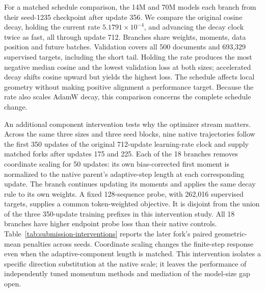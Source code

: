 For a matched schedule comparison, the 14M and 70M models each branch
from their seed-1235 checkpoint after update 356. We compare the original
cosine decay, holding the current rate $5.1791\times10^{-4}$, and advancing
the decay clock twice as fast, all through update 712. Branches share
weights, moments, data position and future batches. Validation covers
all 500 documents and 693,329 supervised targets, including the short tail.
Holding the rate produces the most negative median cosine and the lowest
validation loss at both sizes; accelerated decay shifts cosine upward
but yields the highest loss. The schedule affects local geometry without
making positive alignment a performance target. Because the rate also
scales AdamW decay, this comparison concerns the complete schedule change.

An additional component intervention tests why the optimizer stream matters.
Across the same three sizes and three seed blocks, nine native trajectories
follow the first 350 updates of the original 712-update learning-rate clock
and supply matched forks after updates 175 and 225. Each of the
18 branches removes coordinate scaling for 50 updates: its own bias-corrected
first moment is normalized to the native parent's adaptive-step length
at each corresponding update. The branch continues updating its moments
and applies the same decay rule to its own weights. A fixed 128-sequence
probe, with 262,016 supervised targets, supplies a common token-weighted
objective. It is disjoint from the union of the three 350-update
training prefixes in this intervention study.
All 18 branches have higher endpoint probe loss than their native controls.
Table~\ref{tab:submission-interventions} reports the later fork's paired
geometric-mean penalties across seeds. Coordinate scaling changes the
finite-step response even when the adaptive-component length is matched.
This intervention isolates a specific direction substitution at the native
scale; it leaves the performance of independently tuned momentum methods
and mediation of the model-size gap open.

\begin{table}[tp]
 \caption{Selected matched interventions. Each row uses its own control,
 objective and time window. In the first two rows, entries follow original
 decay / held rate / accelerated decay; cosine medians use affected pairs
 358--712 and validation loss is measured at update 712. Scaling-ablation
 penalties are $100[\exp(\operatorname{mean}_{\mathrm{seed}}
 \log(\mathcal L_{\mathrm{ablated}}/\mathcal L_{\mathrm{native}}))-1]$
 on the fixed probe. Other percentages compare the indicated training-loss
 statistic with its matched unchanged control; positive means higher loss.
 These selected development comparisons are not independent confirmations
 of a common intervention effect.}
 \label{tab:submission-interventions}
 \centering
 \footnotesize
 \setlength{\tabcolsep}{3pt}
 \renewcommand{\arraystretch}{1.12}
 
\end{table}

